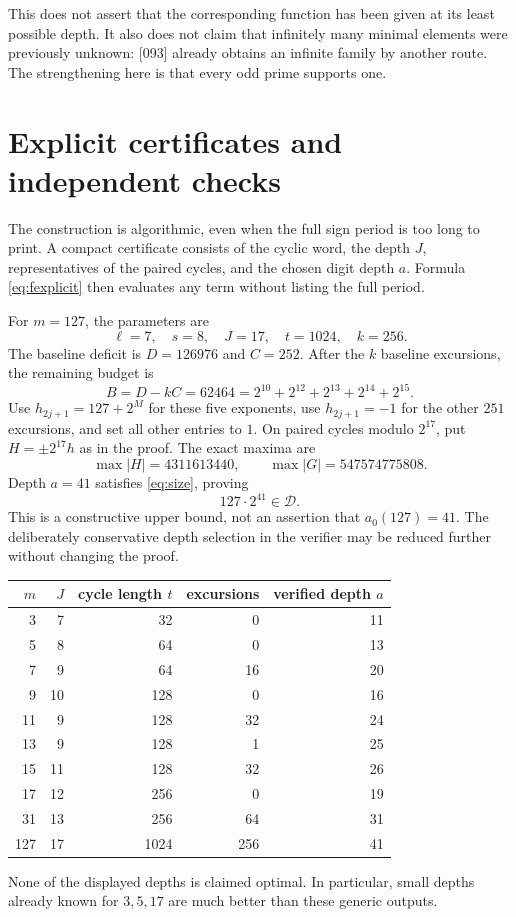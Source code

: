 \documentclass[11pt,a4paper]{article}
\theoremstyle{definition}\newtheorem{definition}[theorem]{Definition}
\theoremstyle{remark}\newtheorem{remark}[theorem]{Remark}
\newcommand{\Dset}{\mathcal D}\newcommand{\wt}{\operatorname{wt}}
\begin{document}
This does not assert that the corresponding function has been given
at its least possible depth. It also does not claim that infinitely
many minimal elements were previously unknown: [093] already obtains
an infinite family by another route. The strengthening here is that
every odd prime supports one.

\section{Explicit certificates and independent checks}\label{sec:checks}
The construction is algorithmic, even when the full sign period is
too long to print. A compact certificate consists of the cyclic word,
the depth $J$, representatives of the paired cycles, and the chosen
digit depth $a$. Formula \eqref{eq:fexplicit} then evaluates any term
without listing the full period.

For $m=127$, the parameters are
\[
 \ell=7,\quad s=8,\quad J=17,\quad t=1024,\quad k=256.
\]
The baseline deficit is $D=126976$ and $C=252$. After the $k$ baseline
excursions, the remaining budget is
\[
 B=D-kC=62464=2^{10}+2^{12}+2^{13}+2^{14}+2^{15}.
\]
Use $h_{2j+1}=127+2^M$ for these five exponents, use $h_{2j+1}=-1$
for the other $251$ excursions, and set all other entries to $1$.
On paired cycles modulo $2^{17}$, put $H=\pm2^{17}h$ as in the proof.
The exact maxima are
\[
 \max|H|=4311613440,\qquad \max|G|=547574775808.
\]
Depth $a=41$ satisfies \eqref{eq:size}, proving
\[
 127\cdot2^{41}\in\Dset.
\]
This is a constructive upper bound, not an assertion that $a_0(127)=41$.
The deliberately conservative depth selection in the verifier may be
reduced further without changing the proof.

\begin{center}
\begin{tabular}{rrrrr}
\toprule
$m$ & $J$ & cycle length $t$ & excursions & verified depth $a$\\
\midrule
3&7&32&0&11\\
5&8&64&0&13\\
7&9&64&16&20\\
9&10&128&0&16\\
11&9&128&32&24\\
13&9&128&1&25\\
15&11&128&32&26\\
17&12&256&0&19\\
31&13&256&64&31\\
127&17&1024&256&41\\
\bottomrule
\end{tabular}
\end{center}
None of the displayed depths is claimed optimal. In particular, small
depths already known for $3,5,17$ are much better than these generic outputs.
\end{document}
